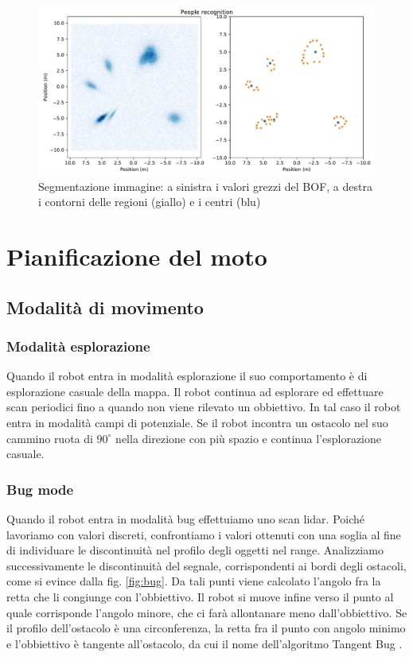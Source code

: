 \documentclass[a4paper]{article}
\begin{document}
	\begin{figure}[H]
		\centering
		\includegraphics[width=1\textwidth]{./img/image_segmentation.pdf}
		\caption{Segmentazione immagine: a sinistra i valori grezzi del BOF, a destra i contorni delle regioni (giallo) e i centri (blu) }
		\label{fig:image_segmentation}
	\end{figure}

	\section{Pianificazione del moto}\label{sec:Pianificazione-del-moto}
	
	\subsection{Modalità di movimento}\label{subsec:Modalità-di-movimento}
	
	\subsubsection{Modalità esplorazione}\label{subsec:Modalita-esplorazione}
	Quando il robot entra in modalità esplorazione il suo comportamento è di esplorazione casuale della mappa. Il robot continua ad esplorare ed effettuare scan periodici fino a quando non viene rilevato un obbiettivo. In tal caso il robot entra in modalità campi di potenziale. Se il robot incontra un ostacolo nel suo cammino ruota di $90^{\circ}$ nella direzione con più spazio e continua l'esplorazione casuale.
	
	\subsubsection{Bug mode}\label{subsec:Bug-mode}
	Quando il robot entra in modalità bug effettuiamo uno scan lidar. Poiché lavoriamo con valori discreti, confrontiamo i valori ottenuti con una soglia al fine di individuare le discontinuità nel profilo degli oggetti nel range. Analizziamo successivamente le discontinuità del segnale, corrispondenti ai bordi degli ostacoli, come si evince dalla fig. \ref{fig:bug}. Da tali punti viene calcolato l'angolo fra la retta che li congiunge con l'obbiettivo. Il robot si muove infine verso il punto al quale corrisponde l'angolo minore, che ci farà allontanare meno dall'obbiettivo. Se il profilo dell'ostacolo è una circonferenza, la retta fra il punto con angolo minimo e l'obbiettivo è tangente all'ostacolo, da cui il nome dell'algoritmo Tangent Bug \cite{503814}.
	
\end{document}
